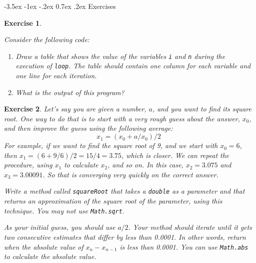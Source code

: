 \documentclass[12pt]{book}
\makeatletter
\renewcommand{\section}{\@startsection {section}{1}{\z@}%
    {-3.5ex \@plus -1ex \@minus -.2ex}%
    {0.7ex \@plus.2ex}%
    {\normalfont\Large\bfseries}}
\theoremstyle{exercise}
\newtheorem{exercise}{Exercise}[chapter]
\newcommand{\java}[1]{\lstinline{#1}} %
\makeatother
\begin{document}
\section{Exercises}


\begin{exercise}
\label{infloop}

Consider the following code:


\begin{enumerate}

\item Draw a table that shows the value of the variables {\tt i} and {\tt n} during the execution of {\tt loop}.
The table should contain one column for each variable and one line for each iteration.

\item What is the output of this program?

\end{enumerate}
\end{exercise}


\begin{exercise}
Let's say you are given a number, $a$, and you want to find its square root.
One way to do that is to start with a very rough guess about the answer, $x_0$, and then improve the guess using the following average:
%
\begin{equation*}
x_1 =(x_0 + a/x_0) / 2
\end{equation*}
%
For example, if we want to find the square root of 9, and we start with $x_0 = 6$, then $x_1 =(6 + 9/6) /2 = 15/4 = 3.75$, which is closer.
We can repeat the procedure, using $x_1$ to calculate $x_2$, and so on.
In this case, $x_2 = 3.075$ and $x_3 = 3.00091$.
So that is converging very quickly on the correct answer.

Write a method called {\tt squareRoot} that takes a \java{double} as a parameter and that returns an approximation of the square root of the parameter, using this technique.
You may not use {\tt Math.sqrt}.

As your initial guess, you should use $a/2$.
Your method should iterate until it gets two consecutive estimates that differ by less than 0.0001.
In other words, return when the absolute value of $x_n - x_{n-1}$ is less than 0.0001.
You can use {\tt Math.abs} to calculate the absolute value.
\end{exercise}
\end{document}
